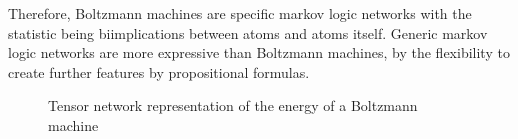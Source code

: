 Therefore, Boltzmann machines are specific markov logic networks with the statistic being biimplications between atoms and atoms itself.
Generic markov logic networks are more expressive than Boltzmann machines, by the flexibility to create further features by propositional formulas.

\begin{figure}[t]
    \begin{center}
        
    \end{center}
    \caption{Tensor network representation of the energy of a Boltzmann machine}
    \label{fig:boltzmannEnergy}
\end{figure}























